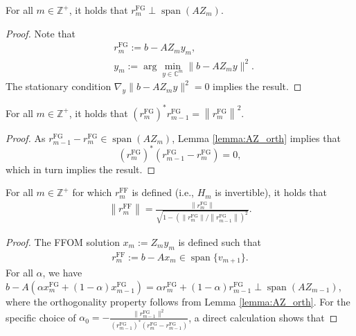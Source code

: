 \documentclass{siamart251216}
\DeclareMathOperator{\spn}{span}
\def\C{\mathbb{C}}
\def\Z{\mathbb{Z}}
\begin{document}
{\begin{lemma} \label{lemma:AZ_orth}
    For all $m \in \Z^+$, it holds that $r_{m}^{\mathrm{FG}} \perp \spn (A Z_{m})$.
\end{lemma}
\begin{proof}
    Note that
    \begin{align*}
         & r_{m}^{\mathrm{FG}} := b - A Z_m y_m,            \\
         & y_m := \arg\min_{y \in \C^m} \|b - A Z_m y \|^2.
    \end{align*}
    The stationary condition $\nabla_y \|b - A Z_m y \|^2 = 0$ implies the result.
\end{proof}
\begin{lemma} \label{lemma:successive_res}
    For all $m \in \Z^+$, it holds that $\left(r_m^{\mathrm{FG}}\right)^* r_{m-1}^{\mathrm{FG}} = \left\|r_m^{\mathrm{FG}}\right\|^2.$
\end{lemma}
\begin{proof}
    As $r_{m-1}^{\mathrm{FG}} - r_m^{\mathrm{FG}} \in \spn (A Z_{m})$, Lemma \ref{lemma:AZ_orth} implies that $$\left(r_m^{\mathrm{FG}}\right)^* \left(r_{m-1}^{\mathrm{FG}} - r_m^{\mathrm{FG}}\right) = 0,$$ which in turn implies the result.
\end{proof}
\begin{proposition} \label{prop:ffom_fgmres}
    For all $m \in \Z^+$ for which $r_m^{\mathrm{FF}}$ is defined (i.e., $H_m$ is invertible), it holds that
    \begin{align} \label{eq:FFOM_FGMRES}
        \left\|r_m^{\mathrm{FF}}\right\| = \frac{\left\|r_m^{\mathrm{FG}}\right\|}{\sqrt{1-\left(\left\|r_m^{\mathrm{FG}}\right\| /\left\|r_{m-1}^{\mathrm{FG}}\right\|\right)^2}}.
    \end{align}
\end{proposition}
\begin{proof}
    The FFOM solution $x_m := Z_m y_m$ is defined such that
    \begin{align*}
        r_m^{\mathrm{FF}} := b - A x_m \in \spn\{v_{m+1}\}.
    \end{align*}
    For all $\alpha$, we have $b - A\left(\alpha x_{m}^{\mathrm{FG}} + (1-\alpha) x_{m-1}^{\mathrm{FG}}\right) = \alpha r_{m}^{\mathrm{FG}} + (1-\alpha) r_{m-1}^{\mathrm{FG}} \perp \spn (A Z_{m-1})$, where the orthogonality property follows from Lemma \ref{lemma:AZ_orth}. For the specific choice of $\alpha_0 = -\frac{\|r_{m-1}^{\mathrm{FG}}\|^2}{ (r_{m-1}^{\mathrm{FG}})^*(r_{m}^{\mathrm{FG}} - r_{m-1}^{\mathrm{FG}})}$, a direct calculation shows that

\end{proof}}
\end{document}
